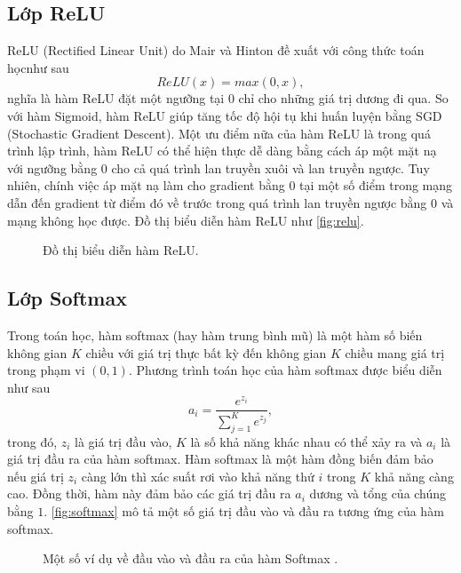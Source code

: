 \subsection{Lớp ReLU}
\label{subsec:lop_relu}
	ReLU (Rectified Linear Unit) do Mair và Hinton \cite{nair2010rectified} đề xuất với công thức toán học\linebreak như sau 
	\begin{equation}
		ReLU(x)=max(0, x),
		\label{eqn:relu}
	\end{equation}
	nghĩa là hàm ReLU đặt một ngưỡng tại 0 chỉ cho những giá trị dương đi qua. So với hàm Sigmoid, hàm ReLU giúp tăng tốc độ hội tụ khi huấn luyện bằng SGD (Stochastic Gradient Descent). Một ưu điểm nữa của hàm ReLU là trong quá trình lập trình, hàm ReLU có thể hiện thực dễ dàng bằng cách áp một mặt nạ với ngưỡng bằng 0 cho cả quá trình lan truyền xuôi và lan truyền ngược. Tuy nhiên, chính việc áp mặt nạ làm cho gradient bằng $0$ tại một số điểm trong mạng dẫn đến gradient từ điểm đó về trước trong quá trình lan truyền ngược bằng $0$ và mạng không học được. Đồ thị biểu diễn hàm ReLU như \autoref{fig:relu}.
	\begin{figure}[h!]
		\centering
		
		\caption{Đồ thị biểu diễn hàm ReLU.}
		\label{fig:relu}
	\end{figure}

\subsection{Lớp Softmax}
\label{subsec:lop_softmax}
	Trong toán học, hàm softmax (hay hàm trung bình mũ) là một hàm số biến không gian $K$ chiều với giá trị thực bất kỳ đến không gian $K$ chiều mang giá trị trong phạm vi $(0, 1)$. Phương trình toán học của hàm softmax được biểu diễn như sau
	\begin{equation}
	a_i=\dfrac{e^{z_i}}{\sum_{j=1}^{K}e^{z_j}},
	\label{eqn:softmax}
	\end{equation}
	trong đó, $z_i$ là giá trị đầu vào, $K$ là số khả năng khác nhau có thể xảy ra và $a_i$ là giá trị đầu ra của hàm softmax. Hàm softmax là một hàm đồng biến đảm bảo nếu giá trị $z_i$ càng lớn thì xác suất rơi vào khả năng thứ $i$ trong $K$ khả năng càng cao. Đồng thời, hàm này đảm bảo các giá trị đầu ra $a_i$ dương và tổng của chúng bằng $1$. \autoref{fig:softmax} mô tả một số giá trị đầu vào và đầu ra tương ứng của hàm softmax.
	\begin{figure}[h!]
		\centering
		
		\caption[Một số ví dụ về đầu vào và đầu ra của hàm Softmax.]{Một số ví dụ về đầu vào và đầu ra của hàm Softmax .}
		
		\label{fig:softmax}
	\end{figure}
	
